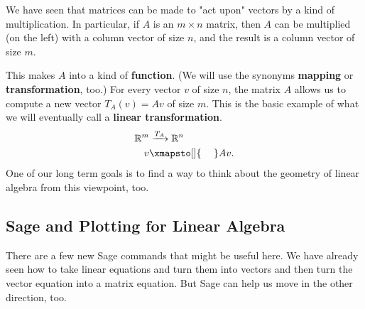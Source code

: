 \documentclass[10pt,]{book}
\newcommand{\terminology}[1]{\textbf{#1}}
\theoremstyle{plain}
\theoremstyle{definition}
\numberwithin{equation}{section}
\begin{document}
        We have seen that matrices can be made to "act upon" vectors by a kind of
        multiplication. In particular, if \(A\) is an \(m\times n\) matrix,
        then \(A\) can be multiplied (on the left) with a column vector of size
        \(n\), and the result is a column vector of size \(m\).
\par

        This makes \(A\) into a kind of \terminology{function}. (We will use
        the synonyms \terminology{mapping} or \terminology{transformation}, too.)
        For every vector \(v\) of size \(n\), the matrix \(A\) allows
        us to compute a new vector \(T_A(v) = Av\) of size \(m\). This is
        the basic example of what we will eventually call a \terminology{linear
        transformation}.\begin{align*}
\mathbb{R}^m & \xrightarrow[]{T_A} \mathbb{R}^n\\
v & \xmapsto[]{\phantom{T_A}} Av.
\end{align*}
        One of our long term goals is to find a way to think about the geometry
        of linear algebra from this viewpoint, too.
\typeout{************************************************}
\typeout{************************************************}
\subsection[Sage and Plotting for Linear Algebra]{Sage and Plotting for Linear Algebra}\label{subsection-22}
There are a few new Sage commands that might be useful here. We have
      already seen how to take linear equations and turn them into vectors
      and then turn the vector equation into a matrix equation. But Sage can
      help us move in the other direction, too.
\par
\end{document}
